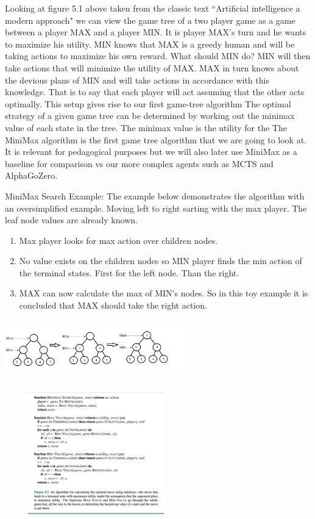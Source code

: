 Looking at figure 5.1 above taken from the classic text ``Artificial intelligence a modern approach" \cite{AIBook} we can view the game tree of a two player game as a game between a player MAX and a player MIN. It is player MAX's turn and he wants to maximize his utility. MIN knows that MAX is a greedy human and will be taking actions to maximize his own reward. What should MIN do? MIN will then take actions that will minimize the utility of MAX. MAX in turn knows about the devious plans of MIN and will take actions in accordance with this knowledge. That is to say that each player will act assuming that the other acts optimally. This setup gives rise to our first game-tree algorithm  
The optimal strategy of a given game tree can be determined by working out the minimax value of each state in the tree. The minimax value is the utility for the 
The MiniMax algorithm is the first game tree algorithm that we are going to look at. It is relevant for pedagogical purposes but we will also later use MiniMax as a baseline for comparison vs our more complex agents such as MCTS and AlphaGoZero. 

MiniMax Search Example: The example below demonstrates the algorithm with an oversimplified example. Moving left to right sarting with the max player. The leaf node values are already known. 

\begin{enumerate}
    \item Max player looks for max action over children nodes.  
    \item No value exists on the children nodes so MIN player finds the min action of the terminal states. First for the left node. Than the right. 
    \item MAX can now calculate the max of MIN's nodes. So in this toy example it is concluded that MAX should take the right action. 
\end{enumerate}

\includegraphics[width=300px,height=100px]{images/minimax_example.png}

\includegraphics[width=300px,height=200px]{images/minimax_algo.png}

